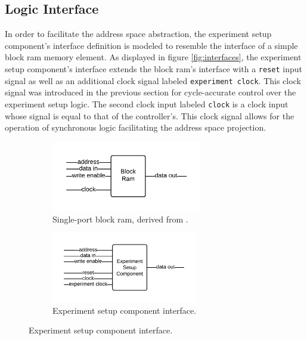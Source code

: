 \documentclass[main.tex]{subfiles}
\begin{document}
\subsection{Logic Interface}
In order to facilitate the address space abstraction, the experiment setup component's interface definition is modeled to resemble the interface of a simple block ram memory element. As displayed in figure \ref{fig:interfaces}, the experiment setup component's interface extends the block ram's interface with a \texttt{reset} input signal as well as an additional clock signal labeled \texttt{experiment clock}. This clock signal was introduced in the previous section for cycle-accurate control over the experiment setup logic. The second clock input labeled \texttt{clock} is a clock input whose signal is equal to that of the controller's. This clock signal allows for the operation of synchronous logic facilitating the address space projection.

\begin{figure}[h]
    \centering
    \caption{A comparison between the interfaces of a block ram and the experiment setup component.}
    \label{fig:interfaces}
    \begin{subfigure}[t]{0.5\textwidth}
        \centering
        \caption{Single-port block ram, derived from \cite[Ch.1]{ug473}.}
        \label{fig:interface-bram}
        \includegraphics[height=1.2in]{img/interface-bram}
    \end{subfigure}%
    \begin{subfigure}[t]{0.5\textwidth}
        \centering
        \caption{Experiment setup component interface.}
        \label{fig:interface-experiment}
        \includegraphics[height=1.2in]{img/interface-experiment}
    \end{subfigure}
\end{figure}
\end{document}

